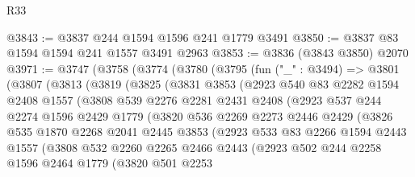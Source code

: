 \begin{lexlean}{R33}
\begin{coremodule}
@3843 := @3837 @244 @1594 @1596 @241 @1779 @3491
@3850 := @3837 @83 @1594 @1594 @241 @1557 @3491 @2963
@3853 := @3836 (@3843 @3850) @2070
@3971 := @3747
    (@3758
      (@3774
        (@3780
          (@3795
            (fun ("_" : @3494) =>
            @3801
              (@3807
                (@3813
                  (@3819
                    (@3825
                      (@3831
                        @3853
                        (@2923
                          @540
                          @83
                          @2282
                          @1594
                          @2408
                          @1557
                          (@3808
                            @539
                            @2276
                            @2281
                            @2431
                            @2408
                            (@2923
                              @537
                              @244
                              @2274
                              @1596
                              @2429
                              @1779
                              (@3820
                                @536
                                @2269
                                @2273
                                @2446
                                @2429
                                (@3826
                                  @535
                                  @1870
                                  @2268
                                  @2041
                                  @2445
                                  @3853
                                  (@2923
                                    @533
                                    @83
                                    @2266
                                    @1594
                                    @2443
                                    @1557
                                    (@3808
                                      @532
                                      @2260
                                      @2265
                                      @2466
                                      @2443
                                      (@2923
                                        @502
                                        @244
                                        @2258
                                        @1596
                                        @2464
                                        @1779
                                        (@3820
                                          @501
                                          @2253

\end{coremodule}
\end{lexlean}

